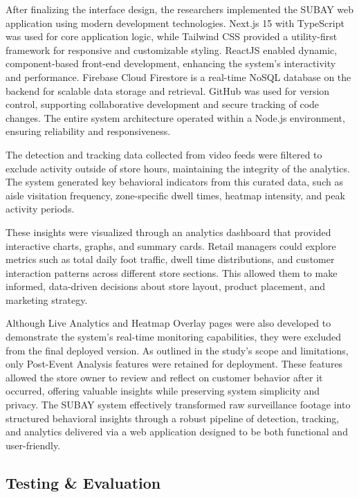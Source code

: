 {After finalizing the interface design, the researchers implemented the SUBAY web application using modern development technologies. Next.js 15 with TypeScript was used for core application logic, while Tailwind CSS provided a utility-first framework for responsive and customizable styling. ReactJS enabled dynamic, component-based front-end development, enhancing the system’s interactivity and performance. Firebase Cloud Firestore is a real-time NoSQL database on the backend for scalable data storage and retrieval. GitHub was used for version control, supporting collaborative development and secure tracking of code changes. The entire system architecture operated within a Node.js environment, ensuring reliability and responsiveness.

The detection and tracking data collected from video feeds were filtered to exclude activity outside of store hours, maintaining the integrity of the analytics. The system generated key behavioral indicators from this curated data, such as aisle visitation frequency, zone-specific dwell times, heatmap intensity, and peak activity periods.

These insights were visualized through an analytics dashboard that provided interactive charts, graphs, and summary cards. Retail managers could explore metrics such as total daily foot traffic, dwell time distributions, and customer interaction patterns across different store sections. This allowed them to make informed, data-driven decisions about store layout, product placement, and marketing strategy.

Although Live Analytics and Heatmap Overlay pages were also developed to demonstrate the system’s real-time monitoring capabilities, they were excluded from the final deployed version. As outlined in the study’s scope and limitations, only Post-Event Analysis features were retained for deployment. These features allowed the store owner to review and reflect on customer behavior after it occurred, offering valuable insights while preserving system simplicity and privacy. The SUBAY system effectively transformed raw surveillance footage into structured behavioral insights through a robust pipeline of detection, tracking, and analytics delivered via a web application designed to be both functional and user-friendly.

\subsection{Testing \& Evaluation}

}
